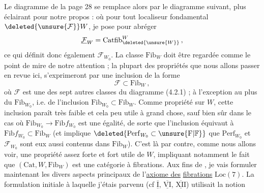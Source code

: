 Le diagramme de la page 28 se remplace alors
par le diagramme  suivant, plus éclairant
pour notre propos :
où pour tout localiseur fondamental $\deleted{\unsure{\mathcal F}}W$, je
pose pour abréger
\[
\underline{\mathcal F}_W=\mathrm{Catfib}^{W}_{\deleted{\unsure{W}}}\,,
\]
ce qui définit donc également $\mathcal F_{W_0}$. La classe $\mathrm{Fib}_W$
doit être regardée comme le point de mire de
notre attention ; la plupart des propriétés  que
nous allons passer en revue ici, s'exprimeront par  une inclusion de la forme
\[
\mathcal F\subset\mathrm{Fib}_W\,,
\]
où $\mathcal F$ est une des sept autres classes du
diagramme (4.2.1) ; à l'exception 
au plus du  $\mathrm{Fib}_{W_0}$, i.e. de l'inclusion
$\mathrm{Fib}_{W_0}\subset\mathrm{Fib}_W$. Comme propriété sur $W$, cette
inclusion paraît très faible et  cela peu
utile à grand chose, sauf bien sûr dans
le cas où $\mathrm{Fib}_{W_0}\longrightarrow\mathrm{Fib}f_{W_0}$ est une égalité,
de  sorte que l'inclusion 
équivaut à $\mathrm{Fib}f_{W_0}\subset\mathrm{Fib}_W$ (et implique
$\deleted{\mathrm{Perf}_{W_0}\subset\unsure{\mathrm F|\mathbb F}}$ que $\mathrm{Perf}_{W_0}$ et $\mathcal F_{W_0}$ sont eux aussi
contenus dans $\mathrm{Fib}_W$). C'est là par contre,
comme nous allons voir, une propriété assez
forte et fort utile de $W$, impliquant notamment le fait que $(\mathrm{Cat},W,\mathrm{Fib}_W)$ est une
catégorie à fibrations.
Aux fins de  , je vais
formuler maintenant les divers aspects principaux
de l'\uline{axiome des} \uline{fibrations} $\mathrm{Loc}(7)$. La formulation
initiale à laquelle j'étais parvenu
(cf $\overline{\underline{\mathrm I}}$, $\overline{\underline{\mathrm{VI}}}$, $\overline{\underline{\mathrm{XII}}}$)  utilisait la notion
